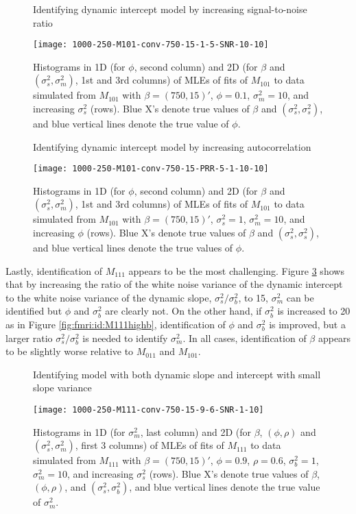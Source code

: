 \begin{figure}
\ssp
\centering
\caption{Identifying dynamic intercept model by increasing signal-to-noise ratio} \label{fig:fmri:id:M101SNR}
\texttt{[image: 1000-250-M101-conv-750-15-1-5-SNR-10-10]}
\caption*{Histograms in 1D (for $\phi$, second column) and 2D (for $\beta$ and $(\sigma^2_s,\sigma^2_m)$, 1st and 3rd columns) of MLEs of fits of $M_{101}$ to data simulated from $M_{101}$ with $\beta = (750,15)'$, $\phi = 0.1$, $\sigma^2_m = 10$, and increasing $\sigma^2_s$ (rows). Blue X's denote true values of $\beta$ and $(\sigma^2_s,\sigma^2_s)$, and blue vertical lines denote the true value of $\phi$.}
\end{figure}

\begin{figure}
\ssp
\centering
\caption{Identifying dynamic intercept model by increasing autocorrelation} \label{fig:fmri:id:M101PRR}
\texttt{[image: 1000-250-M101-conv-750-15-PRR-5-1-10-10]}
\caption*{Histograms in 1D (for $\phi$, second column) and 2D (for $\beta$ and $(\sigma^2_s,\sigma^2_m)$, 1st and 3rd columns) of MLEs of fits of $M_{101}$ to data simulated from $M_{101}$ with $\beta = (750,15)'$, $\sigma^2_s = 1$, $\sigma^2_m = 10$, and increasing $\phi$ (rows). Blue X's denote true values of $\beta$ and $(\sigma^2_s,\sigma^2_s)$, and blue vertical lines denote the true values of $\phi$.}
\end{figure}

Lastly, identification of $M_{111}$ appears to be the most challenging. Figure \ref{fig:fmri:id:M111lowb} shows that by increasing the ratio of the white noise variance of the dynamic intercept to the white noise variance of the dynamic slope, $\sigma^2_s / \sigma^2_b$, to 15, $\sigma^2_m$ can be identified but $\phi$ and $\sigma^2_b$ are clearly not. On the other hand, if $\sigma^2_b$ is increased to 20 as in Figure \ref{fig:fmri:id:M111highb}, identification of $\phi$ and $\sigma^2_b$ is improved, but a larger ratio $\sigma^2_s / \sigma^2_b$ is needed to identify $\sigma^2_m$. In all cases, identification of $\beta$ appears to be slightly worse relative to $M_{011}$ and $M_{101}$.

\begin{figure}
\ssp
\centering
\caption{Identifying model with both dynamic slope and intercept with small slope variance} \label{fig:fmri:id:M111lowb}
\texttt{[image: 1000-250-M111-conv-750-15-9-6-SNR-1-10]}
\caption*{Histograms in 1D (for $\sigma^2_m$, last column) and 2D (for $\beta$, $(\phi,\rho)$ and $(\sigma^2_s,\sigma^2_m)$, first 3 columns) of MLEs of fits of $M_{111}$ to data simulated from $M_{111}$ with $\beta = (750,15)'$, $\phi = 0.9$, $\rho = 0.6$, $\sigma^2_b = 1$, $\sigma^2_m = 10$, and increasing $\sigma^2_s$ (rows). Blue X's denote true values of $\beta$, $(\phi,\rho)$, and $(\sigma^2_s,\sigma^2_b)$, and blue vertical lines denote the true value of $\sigma^2_m$.}
\end{figure}

